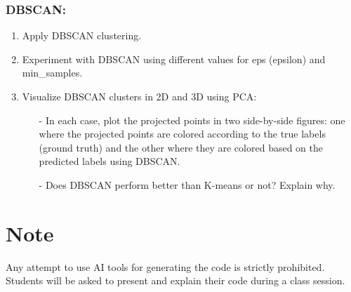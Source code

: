 \documentclass{article}
\begin{document}
		\subsubsection*{DBSCAN:}
		\begin{enumerate}
			\item Apply DBSCAN clustering.
			\item Experiment with DBSCAN using different values for eps (epsilon) and min\_samples.
			\item Visualize DBSCAN clusters in 2D and 3D using PCA:
			\begin{itemize}
				\item[-] In each case, plot the projected points in two side-by-side figures: one where the projected points are colored according to the true labels (ground truth) and the other where they are colored based on the predicted labels using DBSCAN.
				\item[-] Does DBSCAN perform better than K-means or not? Explain why.
			\end{itemize}
		\end{enumerate}
	\section*{Note}
	Any attempt to use AI tools for generating the code is strictly prohibited. Students will be asked to present and explain their code during a class session.
\end{document}
